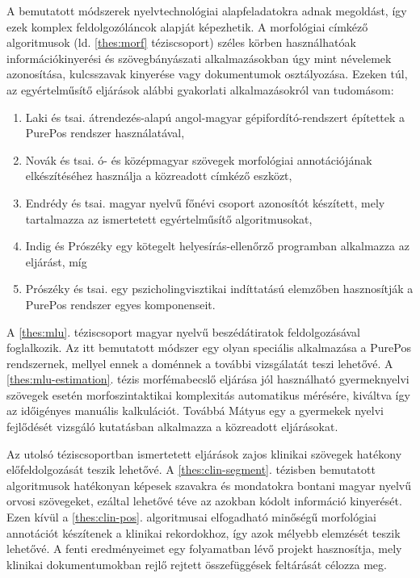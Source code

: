 A bemutatott módszerek nyelvtechnológiai alapfeladatokra adnak megoldást, így ezek komplex feldolgozóláncok alapját képezhetik.
A morfológiai címkéző algoritmusok (ld. \ref{thes:morf} téziscsoport) széles körben használhatóak információkinyerési és szövegbányászati alkalmazásokban úgy mint névelemek azonosítása, kulcsszavak kinyerése vagy dokumentumok osztályozása.
Ezeken túl, az egyértelműsítő eljárások alábbi gyakorlati alkalmazásokról van tudomásom:
\begin{enumerate} %
\item Laki és tsai. átrendezés-alapú angol-magyar gépifordító-rendszert \cite{Laki2013} építettek a PurePos rendszer használatával,
\item Novák és tsai. ó- és középmagyar szövegek morfológiai annotációjának elkészítéséhez használja \cite{Novak2013} a közreadott címkéző eszközt,
\item Endrédy és tsai. \cite{Endredy2014} magyar nyelvű főnévi csoport azonosítót készített, mely tartalmazza az ismertetett egyértelműsítő algoritmusokat,
\item Indig és Prószéky \cite{Indig2013} egy kötegelt helyesírás-ellenőrző programban alkalmazza az eljárást, míg
\item Prószéky és tsai. egy pszicholingvisztikai indíttatású elemzőben hasznosítják \cite{Proszeky2014} a PurePos rendszer egyes komponenseit.
\end{enumerate}

A \ref{thes:mlu}. téziscsoport magyar nyelvű beszédátiratok feldolgozásával foglalkozik. 
Az itt bemutatott módszer egy olyan speciális alkalmazása a PurePos rendszernek, mellyel ennek a doménnek a további vizsgálatát teszi lehetővé.
A \ref{thes:mlu-estimation}. tézis morfémabecslő eljárása jól használható gyermeknyelvi szövegek esetén morfoszintaktikai komplexitás automatikus mérésére, kiváltva így az időigényes manuális kalkulációt.
Továbbá Mátyus \cite{Matyus2014b} egy a gyermekek nyelvi fejlődését vizsgáló kutatásban alkalmazza a közreadott eljárásokat. 

Az utolsó téziscsoportban ismertetett eljárások zajos klinikai szövegek hatékony előfeldolgozását teszik lehetővé.
A \ref{thes:clin-segment}. tézisben bemutatott algoritmusok hatékonyan képesek szavakra és mondatokra bontani magyar nyelvű orvosi szövegeket, ezáltal lehetővé téve az azokban kódolt információ kinyerését. 
Ezen kívül a \ref{thes:clin-pos}. algoritmusai elfogadható minőségű morfológiai annotációt készítenek a klinikai rekordokhoz, így azok mélyebb elemzését teszik lehetővé.
A fenti eredményeimet egy folyamatban lévő projekt \cite{Siklosi2014,Siklosi2014mszny} hasznosítja, mely klinikai dokumentumokban rejlő rejtett összefüggések feltárását célozza  meg.


